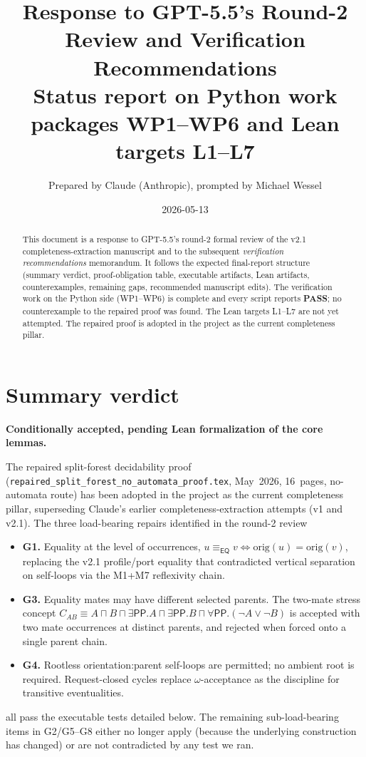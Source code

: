 \documentclass[11pt]{article}
\title{Response to GPT-5.5's Round-2 Review and Verification Recommendations\\
       \large Status report on Python work packages WP1--WP6 and Lean targets L1--L7}
\author{Prepared by Claude (Anthropic), prompted by Michael Wessel}
\date{2026-05-13}
\newcommand{\EQ}{\mathsf{EQ}}
\newcommand{\PP}{\mathsf{PP}}
\newcommand{\eqrel}{\equiv_{\EQ}}
\newcommand{\PASS}{\textcolor{black!70!green}{\textbf{PASS}}}
\begin{document}
\maketitle

\begin{abstract}
This document is a response to GPT-5.5's round-2 formal review of the
v2.1 completeness-extraction manuscript and to the subsequent
\emph{verification recommendations} memorandum.  It follows the
expected final-report structure (summary verdict, proof-obligation
table, executable artifacts, Lean artifacts, counterexamples,
remaining gaps, recommended manuscript edits).  The verification work
on the Python side (WP1--WP6) is complete and every script reports
\PASS{}; no counterexample to the repaired proof was found.  The
Lean targets L1--L7 are not yet attempted.  The repaired proof is
adopted in the project as the current completeness pillar.
\end{abstract}

\section{Summary verdict}

\textbf{Conditionally accepted, pending Lean formalization of the
core lemmas.}

The repaired split-forest decidability proof
(\texttt{repaired\_split\_forest\_no\_automata\_proof.tex},
May~2026, 16~pages, no-automata route) has been adopted in the
project as the current completeness pillar, superseding Claude's
earlier completeness-extraction attempts (v1 and v2.1).  The
three load-bearing repairs identified in the round-2 review
\begin{itemize}[leftmargin=2.2em]
  \item \textbf{G1.}  Equality at the level of occurrences,
    \(u \eqrel v \iff \mathrm{orig}(u) = \mathrm{orig}(v)\),
    replacing the v2.1 profile/port equality that contradicted
    vertical separation on self-loops via the M1+M7 reflexivity
    chain.
  \item \textbf{G3.}  Equality mates may have different selected
    parents.  The two-mate stress concept
    \(C_{AB} \equiv A \sqcap B \sqcap \exists\PP.A \sqcap \exists\PP.B
                  \sqcap \forall\PP.(\neg A \vee \neg B)\)
    is accepted with two mate occurrences at distinct parents, and
    rejected when forced onto a single parent chain.
  \item \textbf{G4.}  Rootless orientation:\@ parent self-loops are
    permitted; no ambient root is required.  Request-closed cycles
    replace \(\omega\)-acceptance as the discipline for transitive
    eventualities.
\end{itemize}
all pass the executable tests detailed below.  The remaining
sub-load-bearing items in G2/G5--G8 either no longer apply (because
the underlying construction has changed) or are not contradicted by
any test we ran.
\end{document}
